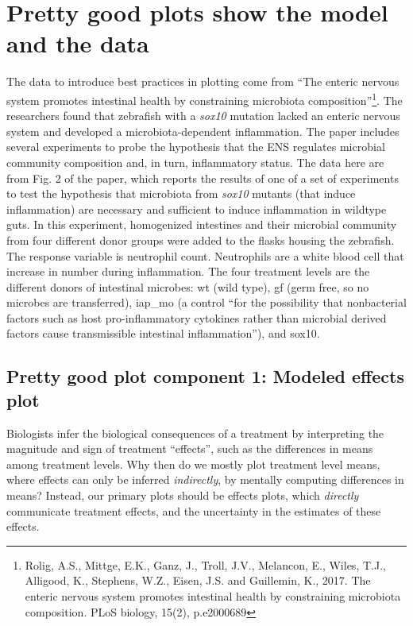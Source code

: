 \documentclass[]{book}
\let\rmarkdownfootnote\footnote%
\def\footnote{\protect\rmarkdownfootnote}
\begin{document}
\hypertarget{pretty-good-plots-show-the-model-and-the-data}{%
\section{Pretty good plots show the model and the data}\label{pretty-good-plots-show-the-model-and-the-data}}

The data to introduce best practices in plotting come from ``The enteric nervous system promotes intestinal health by constraining microbiota composition''\footnote{Rolig, A.S., Mittge, E.K., Ganz, J., Troll, J.V., Melancon, E., Wiles, T.J., Alligood, K., Stephens, W.Z., Eisen, J.S. and Guillemin, K., 2017. The enteric nervous system promotes intestinal health by constraining microbiota composition. PLoS biology, 15(2), p.e2000689}. The researchers found that zebrafish with a \emph{sox10} mutation lacked an enteric nervous system and developed a microbiota-dependent inflammation. The paper includes several experiments to probe the hypothesis that the ENS regulates microbial community composition and, in turn, inflammatory status. The data here are from Fig. 2 of the paper, which reports the results of one of a set of experiments to test the hypothesis that microbiota from \emph{sox10} mutants (that induce inflammation) are necessary and sufficient to induce inflammation in wildtype guts. In this experiment, homogenized intestines and their microbial community from four different donor groups were added to the flasks housing the zebrafish. The response variable is neutrophil count. Neutrophils are a white blood cell that increase in number during inflammation. The four treatment levels are the different donors of intestinal microbes: wt (wild type), gf (germ free, so no microbes are transferred), iap\_mo (a control ``for the possibility that nonbacterial factors such as host pro-inflammatory cytokines rather than microbial derived factors cause transmissible intestinal inflammation''), and sox10.

\hypertarget{pretty-good-plot-component-1-modeled-effects-plot}{%
\subsection{Pretty good plot component 1: Modeled effects plot}\label{pretty-good-plot-component-1-modeled-effects-plot}}

Biologists infer the biological consequences of a treatment by interpreting the magnitude and sign of treatment ``effects'', such as the differences in means among treatment levels. Why then do we mostly plot treatment level means, where effects can only be inferred \emph{indirectly}, by mentally computing differences in means? Instead, our primary plots should be effects plots, which \emph{directly} communicate treatment effects, and the uncertainty in the estimates of these effects.
\end{document}
